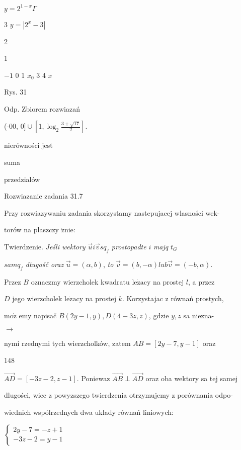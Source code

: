 \documentclass[a4paper,12pt]{article}
\begin{document}
$y=2^{1-x}  \Gamma$

3  $y=|2^{x}-3|$

2

1

$-1$  0 1  $x_{0}$  3 4  {\it x}

Rys. 31

Odp. Zbiorem rozwiazań

(-00, $ 0]\cup [1,\displaystyle \log_{2}\frac{3+\sqrt{17}}{2}].$

nierówności jest

suma

przedzialów

Rozwiazanie zadania 31.7

Przy rozwiazywaniu zadania skorzystamy nastepujacej wlasności wek-

torów na plaszczy $\acute{\mathrm{z}}\mathrm{n}\mathrm{i}\mathrm{e}$:

$\mathrm{T}\mathrm{w}\mathrm{i}\mathrm{e}\mathrm{r}\mathrm{d}\mathrm{z}\mathrm{e}\mathrm{n}\mathrm{i}\mathrm{e}$. {\it Jeśli wektory} $\vec{u}i\vec{v}sq_{f}$ {\it prostopadte} $i$ {\it majq} $t_{G}$

$samq_{f}$ {\it dtugośč oraz} $\vec{u}=(\alpha,b)$, {\it to} $\vec{v}=(b,-\alpha) lub\vec{v}=(-b,\alpha).$

Przez $B$ oznaczmy wierzcholek kwadratu $\mathrm{l}\mathrm{e}\dot{\mathrm{z}}\mathrm{a}\mathrm{c}\mathrm{y}$ na prostej $l$, a przez

$D$ jego wierzcholek $\mathrm{l}\mathrm{e}\dot{\mathrm{z}}\mathrm{a}\mathrm{c}\mathrm{y}$ na prostej $k$. Korzystajac $\mathrm{z}$ równań prostych,

$\mathrm{m}\mathrm{o}\dot{\mathrm{z}}$ emy napisač $B(2y-1,y), D(4-3z,z)$, gdzie $y, z$ sa niezna-

$\rightarrow$

nymi rzednymi tych wierzcholków, zatem $AB= [2y-7,y-1]$ oraz





148

$\vec{AD}= [-3z-2,z-1]$. Poniewaz $\vec{AB}\perp\vec{AD}$ oraz oba wektory sa tej samej

dlugości, wiec $\mathrm{z}$ powyzszego twierdzenia otrzymujemy $\mathrm{z}$ porównania odpo-

wiednich wspólrzednych dwa uklady równań liniowych:

$\left\{\begin{array}{l}
2y-7=-z+1\\
-3z-2=y-1
\end{array}\right.$
\end{document}

